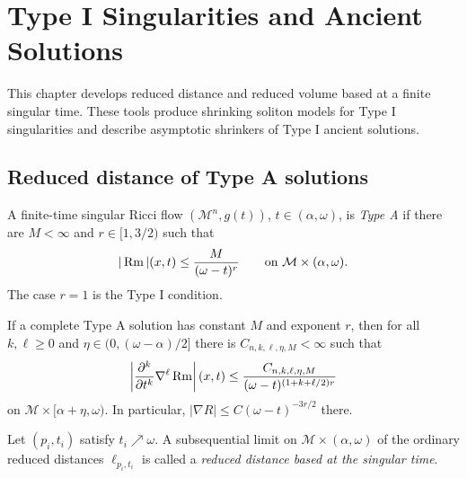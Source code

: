 \chapter{Type I Singularities and Ancient Solutions}
\label{ch:chow-iv-type-i-singularities-ancient-solutions}

This chapter develops reduced distance and reduced volume based at a finite
singular time.  These tools produce shrinking soliton models for Type I
singularities and describe asymptotic shrinkers of Type I ancient solutions.

\section{Reduced distance of Type A solutions}

\begin{definition}
\label{def:chow-iv-type-a-singular-solution}
A finite-time singular Ricci flow
\((\mathcal M^n,g(t))\), \(t\in(\alpha,\omega)\), is \emph{Type A} if there
are \(M<\infty\) and \(r\in[1,3/2)\) such that
\[
 |\Rm|(x,t)\leq \frac{M}{(\omega-t)^r}
 \qquad\text{on }\mathcal M\times(\alpha,\omega).
\]
The case \(r=1\) is the Type I condition.
\end{definition}

\begin{lemma}
\label{lem:chow-iv-shi-estimates-type-a}
If a complete Type A solution has constant \(M\) and exponent \(r\), then for
all \(k,\ell\geq0\) and
\(\eta\in(0,(\omega-\alpha)/2]\) there is
\(C_{n,k,\ell,\eta,M}<\infty\) such that
\[
 \left|\frac{\partial^k}{\partial t^k}\nabla^\ell\operatorname{Rm}\right|(x,t)
 \leq \frac{C_{n,k,\ell,\eta,M}}
 {(\omega-t)^{(1+k+\ell/2)r}}
\]
on \(\mathcal M\times[\alpha+\eta,\omega)\).  In particular,
\(|\nabla R|\leq C(\omega-t)^{-3r/2}\) there.
\end{lemma}

\begin{definition}
\label{def:chow-iv-reduced-distance-singular-time}
Let \((p_i,t_i)\) satisfy \(t_i\nearrow\omega\).  A subsequential limit on
\(\mathcal M\times(\alpha,\omega)\) of the ordinary reduced distances
\(\ell_{p_i,t_i}\) is called a \emph{reduced distance based at the singular
time}.
\end{definition}

